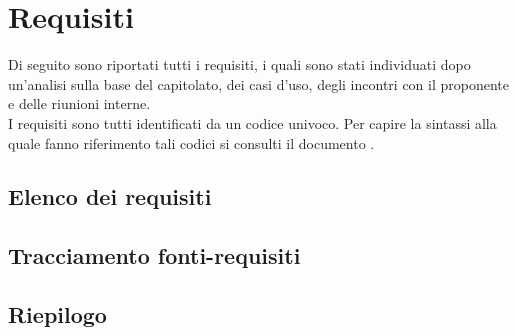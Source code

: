 \section{Requisiti}

Di seguito sono riportati tutti i requisiti, i quali sono stati individuati dopo un'analisi sulla base del capitolato, dei casi d'uso, degli incontri con il proponente e delle riunioni interne.\\
I requisiti sono tutti identificati da un codice univoco. Per capire la sintassi alla quale fanno riferimento tali codici si consulti il documento .

%

\subsection{Elenco dei requisiti}


%

\subsection{Tracciamento fonti-requisiti}


\subsection{Riepilogo}

